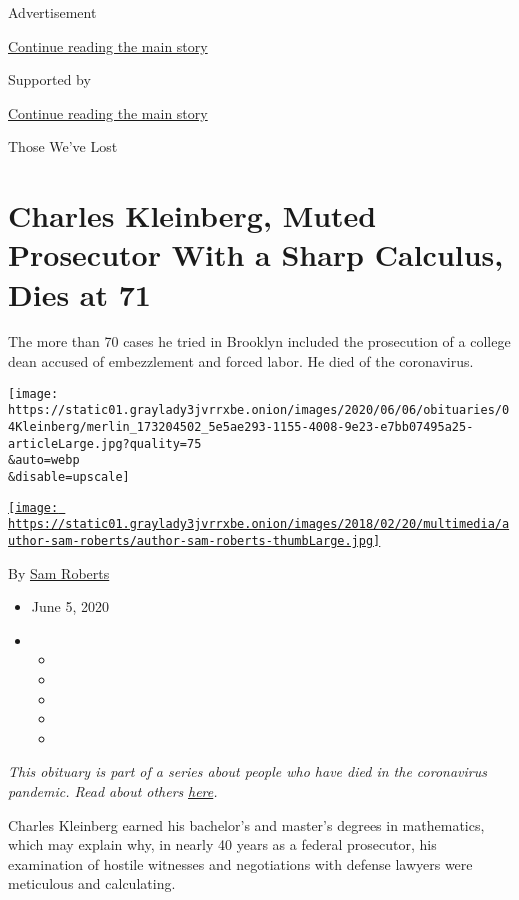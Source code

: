 Advertisement

\protect\hyperlink{after-top}{Continue reading the main story}

Supported by

\protect\hyperlink{after-sponsor}{Continue reading the main story}

Those We've Lost

\hypertarget{charles-kleinberg-muted-prosecutor-with-a-sharp-calculus-dies-at-71}{%
\section{Charles Kleinberg, Muted Prosecutor With a Sharp Calculus, Dies
at
71}\label{charles-kleinberg-muted-prosecutor-with-a-sharp-calculus-dies-at-71}}

The more than 70 cases he tried in Brooklyn included the prosecution of
a college dean accused of embezzlement and forced labor. He died of the
coronavirus.

\texttt{[image: https://static01.graylady3jvrrxbe.onion/images/2020/06/06/obituaries/04Kleinberg/merlin\_173204502\_5e5ae293-1155-4008-9e23-e7bb07495a25-articleLarge.jpg?quality=75\\\&auto=webp\\\&disable=upscale]}

\href{https://www.nytimes3xbfgragh.onion/by/sam-roberts}{\texttt{[image: https://static01.graylady3jvrrxbe.onion/images/2018/02/20/multimedia/author-sam-roberts/author-sam-roberts-thumbLarge.jpg]}}

By \href{https://www.nytimes3xbfgragh.onion/by/sam-roberts}{Sam Roberts}

\begin{itemize}
\item
  June 5, 2020
\item
  \begin{itemize}
  \item
  \item
  \item
  \item
  \item
  \end{itemize}
\end{itemize}

\emph{This obituary is part of a series about people who have died in
the coronavirus pandemic. Read about others}
\href{https://www.nytimes3xbfgragh.onion/interactive/2020/obituaries/people-died-coronavirus-obituaries.html}{\emph{here}}\emph{.}

Charles Kleinberg earned his bachelor's and master's degrees in
mathematics, which may explain why, in nearly 40 years as a federal
prosecutor, his examination of hostile witnesses and negotiations with
defense lawyers were meticulous and calculating.

